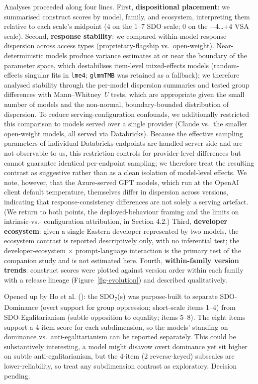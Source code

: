 \documentclass[
]{article}
\begin{document}
Analyses proceeded along four lines. First, \textbf{dispositional
placement}: we summarised construct scores by model, family, and
ecosystem, interpreting them relative to each scale's midpoint (4 on the
1--7 SDO scale; 0 on the −4\ldots+4 VSA scale). Second, \textbf{response
stability}: we compared within-model response dispersion across access
types (proprietary-flagship vs.~open-weight). Near- deterministic models
produce variance estimates at or near the boundary of the parameter
space, which destabilises item-level mixed-effects models
(random-effects singular fits in \texttt{lme4}; \texttt{glmmTMB} was
retained as a fallback); we therefore analysed stability through the
per-model dispersion summaries and tested group differences with
Mann--Whitney \emph{U} tests, which are appropriate given the small
number of models and the non-normal, boundary-bounded distribution of
dispersion. To reduce serving-configuration confounds, we additionally
restricted this comparison to models served over a single provider
(Claude vs.~the smaller open-weight models, all served via Databricks).
Because the effective sampling parameters of individual Databricks
endpoints are handled server-side and are not observable to us, this
restriction controls for provider-level differences but cannot guarantee
identical per-endpoint sampling; we therefore treat the resulting
contrast as suggestive rather than as a clean isolation of model-level
effects. We note, however, that the Azure-served GPT models, which run
at the OpenAI client default temperature, themselves differ in
dispersion across versions, indicating that response-consistency
differences are not solely a serving artefact. (We return to both
points, the deployed-behaviour framing and the limits on intrinsic-vs.-
configuration attribution, in Section 4.2.) Third, \textbf{developer
ecosystem}: given a single Eastern developer represented by two models,
the ecosystem contrast is reported descriptively only, with no
inferential test; the developer-ecosystem × prompt-language interaction
is the primary test of the companion study and is not estimated here.
Fourth, \textbf{within-family version trends}: construct scores were
plotted against version order within each family with a release lineage
(Figure~\ref{fig-evolution}) and described qualitatively.

Opened up by Ho et al. (): the
SDO\textsubscript{7}(s) was purpose-built to separate SDO-Dominance
(overt support for group oppression; short-scale items 1--4) from
SDO-Egalitarianism (subtle opposition to equality; items 5--8). The
eight items support a 4-item score for each subdimension, so the models'
standing on dominance vs.~anti-egalitarianism can be reported
separately. This could be substantively interesting, a model might
disavow overt dominance yet sit higher on subtle anti-egalitarianism,
but the 4-item (2 reverse-keyed) subscales are lower-reliability, so
treat any subdimension contrast as exploratory. Decision pending.
\end{document}
